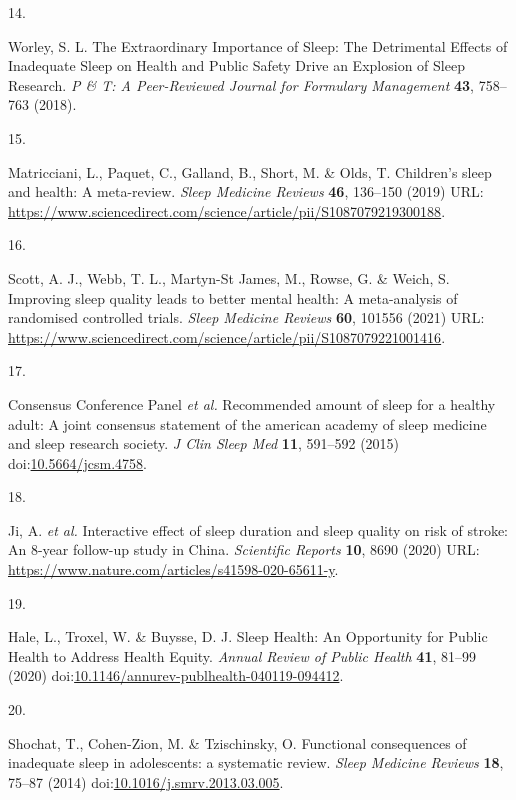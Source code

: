 \documentclass[
  10pt,
]{scrbook}
\newlength{\cslhangindent}
\newlength{\csllabelwidth}
\newlength{\cslentryspacingunit} %
\newenvironment{CSLReferences}[2] %
 {%
  \setlength{\parindent}{0pt}
  \ifodd #1
  \let\oldpar\par
  \def\par{\hangindent=\cslhangindent\oldpar}
  \fi
  \setlength{\parskip}{#2\cslentryspacingunit}
 }%
 {}
\newcommand{\CSLLeftMargin}[1]{\parbox[t]{\csllabelwidth}{#1}}
\newcommand{\CSLRightInline}[1]{\parbox[t]{\linewidth - \csllabelwidth}{#1}\break}
\begin{document}
\begin{CSLReferences}{0}{0}
\leavevmode{}%
\CSLLeftMargin{14. }%
\CSLRightInline{Worley, S. L. The Extraordinary Importance of Sleep: The
Detrimental Effects of Inadequate Sleep on Health and Public Safety
Drive an Explosion of Sleep Research. \emph{P \& T: A Peer-Reviewed
Journal for Formulary Management} \textbf{43}, 758--763 (2018).}

\leavevmode{}%
\CSLLeftMargin{15. }%
\CSLRightInline{Matricciani, L., Paquet, C., Galland, B., Short, M. \&
Olds, T. Children's sleep and health: A meta-review. \emph{Sleep
Medicine Reviews} \textbf{46}, 136--150 (2019) URL:
\url{https://www.sciencedirect.com/science/article/pii/S1087079219300188}.}

\leavevmode{}%
\CSLLeftMargin{16. }%
\CSLRightInline{Scott, A. J., Webb, T. L., Martyn-St James, M., Rowse,
G. \& Weich, S. Improving sleep quality leads to better mental health: A
meta-analysis of randomised controlled trials. \emph{Sleep Medicine
Reviews} \textbf{60}, 101556 (2021) URL:
\url{https://www.sciencedirect.com/science/article/pii/S1087079221001416}.}

\leavevmode{}%
\CSLLeftMargin{17. }%
\CSLRightInline{Consensus Conference Panel \emph{et al.} Recommended
amount of sleep for a healthy adult: A joint consensus statement of the
american academy of sleep medicine and sleep research society. \emph{J
Clin Sleep Med} \textbf{11}, 591--592 (2015)
doi:\href{https://doi.org/10.5664/jcsm.4758}{10.5664/jcsm.4758}.}

\leavevmode{}%
\CSLLeftMargin{18. }%
\CSLRightInline{Ji, A. \emph{et al.} Interactive effect of sleep
duration and sleep quality on risk of stroke: An 8-year follow-up study
in China. \emph{Scientific Reports} \textbf{10}, 8690 (2020) URL:
\url{https://www.nature.com/articles/s41598-020-65611-y}.}

\leavevmode{}%
\CSLLeftMargin{19. }%
\CSLRightInline{Hale, L., Troxel, W. \& Buysse, D. J. Sleep Health: An
Opportunity for Public Health to Address Health Equity. \emph{Annual
Review of Public Health} \textbf{41}, 81--99 (2020)
doi:\href{https://doi.org/10.1146/annurev-publhealth-040119-094412}{10.1146/annurev-publhealth-040119-094412}.}

\leavevmode{}%
\CSLLeftMargin{20. }%
\CSLRightInline{Shochat, T., Cohen-Zion, M. \& Tzischinsky, O.
Functional consequences of inadequate sleep in adolescents: a systematic
review. \emph{Sleep Medicine Reviews} \textbf{18}, 75--87 (2014)
doi:\href{https://doi.org/10.1016/j.smrv.2013.03.005}{10.1016/j.smrv.2013.03.005}.}


\end{CSLReferences}
\end{document}

